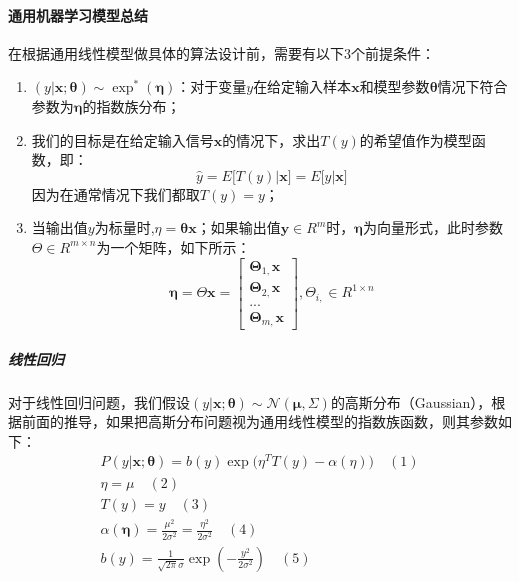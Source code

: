 \documentclass[UTF8]{article}
\begin{document}
\paragraph{通用机器学习模型总结}
在根据通用线性模型做具体的算法设计前，需要有以下3个前提条件：
\begin{enumerate}
\item $(y \vert \boldsymbol{x}; \boldsymbol{\theta})\sim \exp ^{*}(\boldsymbol{\eta})$：对于变量$y$在给定输入样本$\boldsymbol{x}$和模型参数$\boldsymbol{\theta}$情况下符合参数为$\boldsymbol{\eta}$的指数族分布；
\item 我们的目标是在给定输入信号$\boldsymbol{x}$的情况下，求出$T(y)$的希望值作为模型函数，即：
\begin{equation}
\hat{y}=E\Big[T(y) \vert \boldsymbol{x} \Big]=E\Big[y \vert \boldsymbol{x} \Big]
\label{lcrn-gml-yhat}
\end{equation}
因为在通常情况下我们都取$T(y)=y$；
\item 当输出值$y$为标量时,$\eta = \boldsymbol{\theta} \boldsymbol{x}$；如果输出值$\boldsymbol{y} \in R^{m}$时，$\boldsymbol{\eta}$为向量形式，此时参数$\Theta \in R^{m \times n}$为一个矩阵，如下所示：
\begin{equation}
\boldsymbol{\eta} = \Theta \boldsymbol{x} = \begin{bmatrix}
\boldsymbol{\Theta}_{1,}\boldsymbol{x} \\
\boldsymbol{\Theta}_{2,}\boldsymbol{x} \\
... \\
\boldsymbol{\Theta}_{m,}\boldsymbol{x}
\end{bmatrix}, \Theta_{i,} \in R^{1 \times n}
\label{lcrn-gml-eta-vector-formula}
\end{equation}
\end{enumerate}
\subparagraph{线性回归}
对于线性回归问题，我们假设$(y \vert \boldsymbol{x}; \boldsymbol{\theta}) \sim \mathcal{N}(\boldsymbol{\mu}, \Sigma)$的高斯分布（Gaussian），根据前面的推导，如果把高斯分布问题视为通用线性模型的指数族函数，则其参数如下：
\begin{equation}
\begin{aligned}
P(y \vert \boldsymbol{x}; \boldsymbol{\theta}) = b(y)\exp \Big( \eta ^{T}T(y) - \alpha(\eta) \Big)  \quad (1)\\
\eta = \mu  \quad (2) \\
T(y) = y \quad (3) \\
\alpha(\boldsymbol{\eta}) = \frac{\mu ^{2}}{2\sigma ^{2}} = \frac{\eta ^{2}}{2\sigma ^{2}} \quad (4) \\
b(y) = \frac{1}{\sqrt{2\pi}\sigma}\exp(-\frac{y^{2}}{2\sigma ^{2}}) \quad (5)
\end{aligned}
\label{lcrn-gml-linear-regression-summary}
\end{equation}
\end{document}
